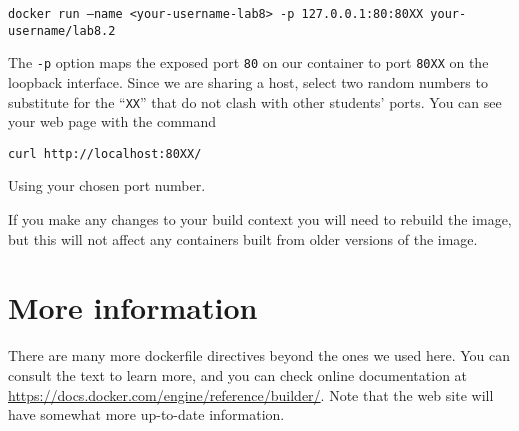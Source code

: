 \documentclass{article}
\begin{document}
\texttt{docker run --name <your-username-lab8> -p 127.0.0.1:80:80XX your-username/lab8.2}

The \texttt{-p} option maps the exposed port \texttt{80} on our container to port \texttt{80XX} on the loopback interface. Since we are sharing a host, select two random numbers to substitute for the ``\texttt{XX}'' that do not clash with other students' ports. You can see your web page with the command

\texttt{curl http://localhost:80XX/}

Using your chosen port number.

If you make any changes  to your build context you will need to rebuild the image, but this will not affect any containers built from older versions of the image.


\section{More information}
There are many more dockerfile directives beyond the ones we used here. You can consult the text to learn more, and you can check online documentation at \url{https://docs.docker.com/engine/reference/builder/}. Note that the web site will have somewhat more up-to-date information.
\end{document}
